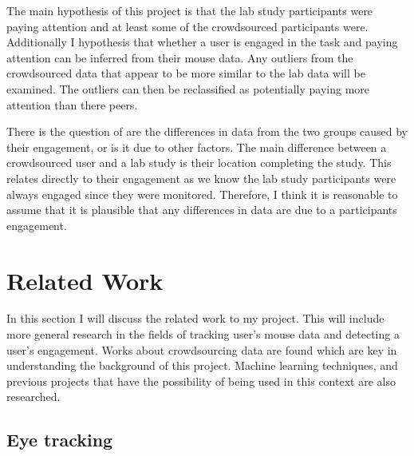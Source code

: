 \documentclass{article}
\begin{document}
The main hypothesis of this project is that the lab study participants were paying attention and at least some of the crowdsourced participants were.
Additionally I hypothesis that whether a user is engaged in the task and paying attention can be inferred from their mouse data.
Any outliers from the crowdsourced data that appear to be more similar to the lab data will be examined.
The outliers can then be reclassified as potentially paying more attention than there peers.

There is the question of are the differences in data from the two groups caused by their engagement, or is it due to other factors.
The main difference between a crowdsourced user and a lab study is their location completing the study.
This relates directly to their engagement as we know the lab study participants were always engaged since they were monitored.
Therefore, I think it is reasonable to assume that it is plausible that any differences in data are due to a participants engagement.

\section{Related Work}



In this section I will discuss the related work to my project.
This will include more general research in the fields of tracking user's mouse data and detecting a user's engagement.
Works about crowdsourcing data are found which are key in understanding the background of this project.
Machine learning techniques, and previous projects that have the possibility of being used in this context are also researched.



\subsection{Eye tracking}
\end{document}
